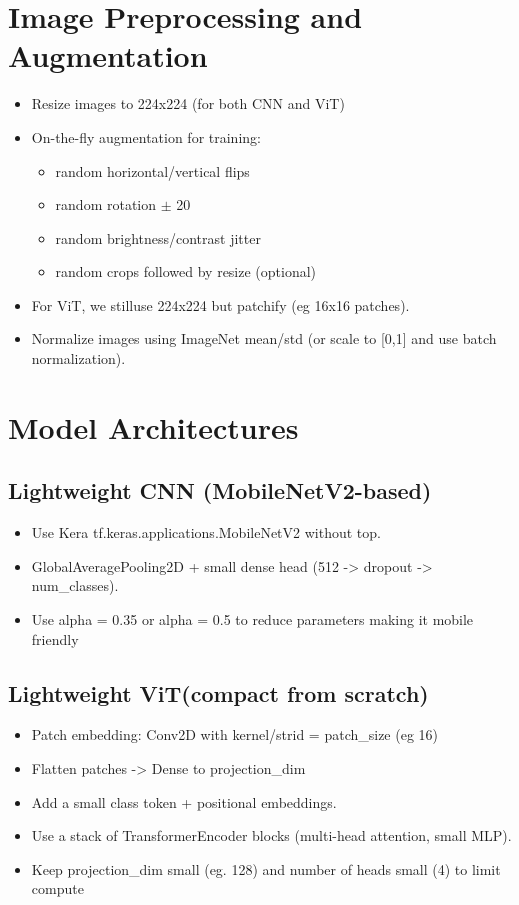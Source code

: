 \section{Image Preprocessing and Augmentation}
\begin{itemize}
	\item Resize images to 224x224 (for both CNN and ViT)
	\item On-the-fly augmentation for training:
	\begin{itemize}
		\item random horizontal/vertical flips
		\item random rotation  $\pm$ 20\degree
		\item random brightness/contrast jitter
		\item random crops followed by resize (optional)
	\end{itemize}
	\item For ViT, we stilluse 224x224 but patchify (eg  16x16 patches).
	\item Normalize images using ImageNet mean/std (or scale to [0,1] and use batch normalization).
\end{itemize}

\section{Model Architectures}

\subsection{Lightweight CNN (MobileNetV2-based)}
\begin{itemize}
	\item Use Kera tf.keras.applications.MobileNetV2 without top.
	\item GlobalAveragePooling2D + small dense head (512 -> dropout -> num\_classes).
	\item Use alpha = 0.35 or alpha = 0.5 to reduce parameters making it mobile friendly
\end{itemize}

\subsection{Lightweight ViT(compact from scratch)}
\begin{itemize}
	\item Patch embedding: Conv2D with kernel/strid = patch\_size (eg 16)
	\item Flatten patches -> Dense to projection\_dim
	\item Add a small class token + positional embeddings.
	\item Use a stack of TransformerEncoder blocks (multi-head attention, small MLP).
	\item Keep projection\_dim small (eg. 128) and number of heads small (4) to limit compute
\end{itemize}

